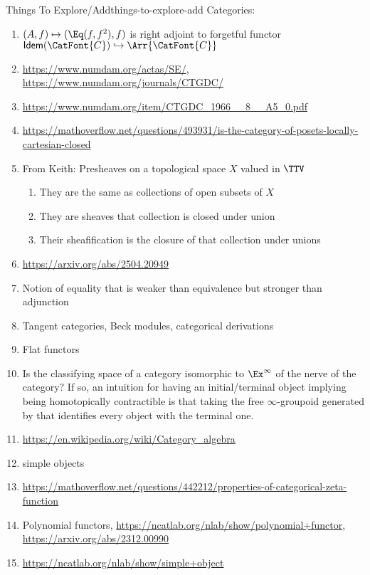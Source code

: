 \begin{remark}{Things To Explore/Add}{things-to-explore-add}
    Categories:
    \begin{enumerate}
        \item $(A,f)\mapsto(\Eq(f,f^{2}),f)$ is right adjoint to forgetful functor $\mathsf{Idem}(\CatFont{C})\hookrightarrow\Arr{\CatFont{C}}$
        \item \url{https://www.numdam.org/actas/SE/}, \url{https://www.numdam.org/journals/CTGDC/}
        \item \url{https://www.numdam.org/item/CTGDC_1966__8__A5_0.pdf}
        \item \url{https://mathoverflow.net/questions/493931/is-the-category-of-posets-locally-cartesian-closed}
        \item From Keith: Presheaves on a topological space $X$ valued in $\TTV$
            \begin{enumerate}
                \item They are the same as collections of open subsets of $X$
                \item They are sheaves \textiff that collection is closed under union
                \item Their sheafification is the closure of that collection under unions
            \end{enumerate}
        \item \url{https://arxiv.org/abs/2504.20949}
        \item Notion of equality that is weaker than equivalence but stronger than adjunction
        \item Tangent categories, Beck modules, categorical derivations
        \item Flat functors
        \item Is the classifying space of a category isomorphic to $\Ex^{\infty}$ of the nerve of the category? If so, an intuition for having an initial/terminal object implying being homotopically contractible is that taking the free $\infty$-groupoid generated by that identifies every object with the terminal one.
        \item \url{https://en.wikipedia.org/wiki/Category_algebra}
        \item simple objects
        \item \url{https://mathoverflow.net/questions/442212/properties-of-categorical-zeta-function}
        \item Polynomial functors, \url{https://ncatlab.org/nlab/show/polynomial+functor}, \url{https://arxiv.org/abs/2312.00990}
        \item \url{https://ncatlab.org/nlab/show/simple+object}

\end{enumerate}
\end{remark}
